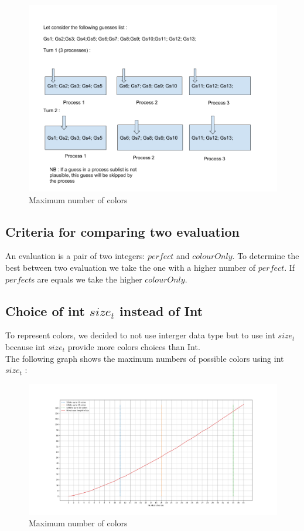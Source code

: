        \begin{figure}[H]
	    \centering
	    \includegraphics[width=15cm] {pTask.png}
	    \caption{Maximum number of colors }
	    \label{plot12}
	\end{figure}
	
	
\subsection{Criteria for comparing two evaluation}
An evaluation is a pair of two integers: $perfect$ and $colourOnly$. To determine the best 
between two evaluation we take the one with a higher number of $perfect$. If $perfect$s are equals
we take the higher $colourOnly$.

\subsection{Choice of int $size_t$ instead of Int}
To represent colors, we decided to not use interger data type but to use int $size_t$ because int $size_t$ provide more colors choices than Int.\\
The following graph shows the maximum numbers of possible colors using int $size_t$ : 

        \begin{figure}[H]
	    \centering
	    \includegraphics[width=15cm] {maxColors.png}
	    \caption{Maximum number of colors }
	    \label{plot12}
	\end{figure}


